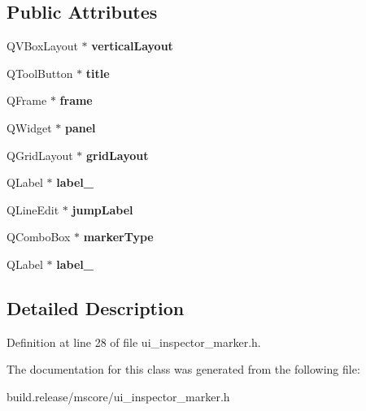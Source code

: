 \subsection*{Public Attributes}
\begin{DoxyCompactItemize}
\item 
\mbox{\label{class_ui___inspector_marker_abb12cb023a8dfbee3e40d74c4ed2aceb}} 
Q\+V\+Box\+Layout $\ast$ {\bfseries vertical\+Layout}
\item 
\mbox{\label{class_ui___inspector_marker_aebb973aef98babeca2c0a9fa8b26ec11}} 
Q\+Tool\+Button $\ast$ {\bfseries title}
\item 
\mbox{\label{class_ui___inspector_marker_a22927ac32fc6eb93849fddb6ff19aa20}} 
Q\+Frame $\ast$ {\bfseries frame}
\item 
\mbox{\label{class_ui___inspector_marker_a8dead0d62f0a36d972ce1ff94d6f8246}} 
Q\+Widget $\ast$ {\bfseries panel}
\item 
\mbox{\label{class_ui___inspector_marker_a66b1929935918898efd6caa8ba7bf1df}} 
Q\+Grid\+Layout $\ast$ {\bfseries grid\+Layout}
\item 
\mbox{\label{class_ui___inspector_marker_a5737d88818cc7ce5a34e7d15468dec5d}} 
Q\+Label $\ast$ {\bfseries label\+\_}
\item 
\mbox{\label{class_ui___inspector_marker_a28a3ffee7789c7097e337e0e143a179a}} 
Q\+Line\+Edit $\ast$ {\bfseries jump\+Label}
\item 
\mbox{\label{class_ui___inspector_marker_a09eaa8a08abfb2baaeac893601ba7d4b}} 
Q\+Combo\+Box $\ast$ {\bfseries marker\+Type}
\item 
\mbox{\label{class_ui___inspector_marker_a0869c1e151c993418c9b78b23b21f7a0}} 
Q\+Label $\ast$ {\bfseries label\+\_}
\end{DoxyCompactItemize}


\subsection{Detailed Description}


Definition at line 28 of file ui\+\_\+inspector\+\_\+marker.\+h.



The documentation for this class was generated from the following file\+:\begin{DoxyCompactItemize}
\item 
build.\+release/mscore/ui\+\_\+inspector\+\_\+marker.\+h\end{DoxyCompactItemize}
